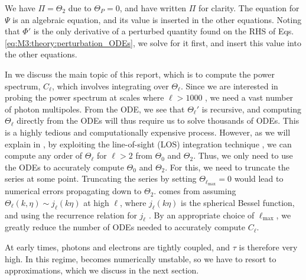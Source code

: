 We have $\Pi=\Theta_2$ due to $\Theta_P=0$, and have written $\Pi$ for clarity. The equation for $\Psi$ is an algebraic equation, and its value is inserted in the other equations. Noting that $\Phi'$ is the only derivative of a perturbed quantity found on the RHS of Eqs. \eqref{eq:M3:theory:perturbation_ODEs}, we solve for it first, and insert this value into the other equations. 

In  we discuss the main topic of this report, which is to compute the power spectrum, $C_\ell$, which involves integrating over $\Theta_\ell$. Since we are interested in probing the power spectrum at scales where $\ell>1000$ , we need a vast number of photon multipoles. From the ODE, we see that $\Theta_\ell'$ is recursive, and computing $\Theta_\ell$ directly from the ODEs will thus require us to solve thousands of ODEs. This is a highly tedious and computationally expensive process. However, as we will explain in , by exploiting the line-of-sight (LOS) integration technique \cite{LOS_integration}, we can compute any order of $\Theta_\ell$ for $\ell>2$ from $\Theta_0$ and $\Theta_2$. Thus, we only need to use the ODEs to accurately compute $\Theta_0$ and $\Theta_2$. For this, we need to truncate the series at some point. Truncating the series by setting $\Theta_{\ell_\mathrm{max}}=0$ would lead to numerical errors propagating down to $\Theta_2$.  comes from assuming $\Theta_\ell(k,\eta)\sim j_\ell(k\eta)$ at high $\ell$, where $j_\ell(k\eta)$ is the spherical Bessel function, and using the recurrence relation for $j_\ell$ \citep[see][Eq. (46)-(49)]{callin}. By an appropriate choice of $\ell_\mathrm{max}$, we greatly reduce the number of ODEs needed to accurately compute $C_\ell$. 

At early times, photons and electrons are tightly coupled, and $\tau$ is therefore very high. In this regime,  becomes numerically unstable, so we have to resort to approximations, which we discuss in the next section.   

